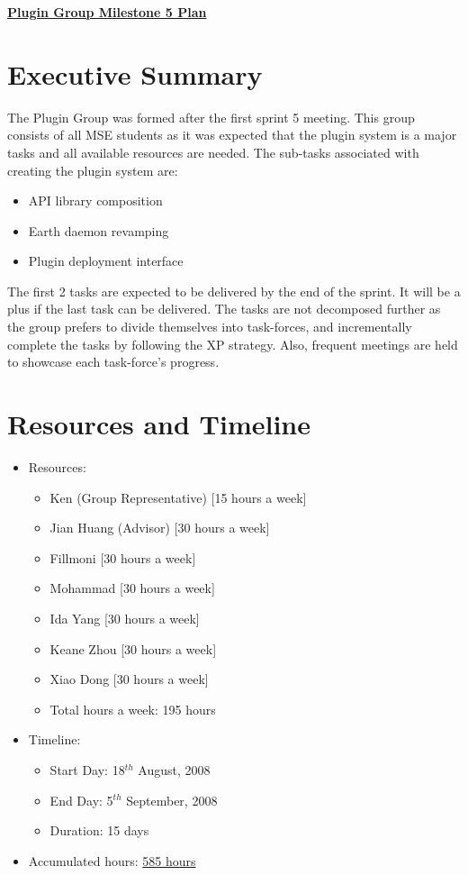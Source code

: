 \documentclass{article}
\begin{document}
\pagestyle{headings}

\begin{center}
{\large\textbf{\underline{Plugin Group Milestone 5 Plan}}}
\end{center}

\section*{Executive Summary}

The Plugin Group was formed after the first sprint 5 meeting. This group consists of all MSE students as it was expected that the plugin system is a major tasks and all available resources are needed. The sub-tasks associated with creating the plugin system are:

\begin{itemize}
   \item API library composition
   \item Earth daemon revamping
   \item Plugin deployment interface
\end{itemize}

The first 2 tasks are expected to be delivered by the end of the sprint. It will be a plus if the last task can be delivered. The tasks are not decomposed further as the group prefers to divide themselves into task-forces, and incrementally complete the tasks by following the XP strategy. Also, frequent meetings are held to showcase each task-force's progress. 

\section*{Resources and Timeline}

\begin{itemize}
   \item Resources:
		\begin{itemize}
		   \item Ken (Group Representative) [15 hours a week]
		   \item Jian Huang (Advisor) [30 hours a week]
		   \item Fillmoni [30 hours a week]
		   \item Mohammad [30 hours a week]
		   \item Ida Yang [30 hours a week]
		   \item Keane Zhou [30 hours a week]
		   \item Xiao Dong [30 hours a week]
		   \item Total hours a week: 195 hours 
		\end{itemize}
   \item Timeline:
       \begin{itemize}
          \item Start Day: 18$^{th}$ August, 2008
          \item End Day: 5$^{th}$ September, 2008
          \item Duration: 15 days
       \end{itemize}
   \item Accumulated hours: \underline{585 hours}
\end{itemize}
\end{document}
